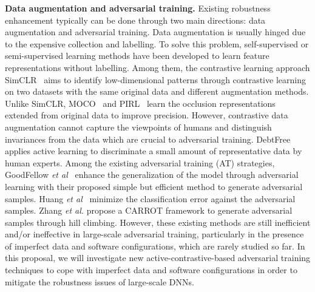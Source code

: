 {\textbf{Data augmentation and adversarial training.}}
Existing robustness enhancement typically can be done through two main directions: data augmentation and adversarial training.
Data augmentation is usually hinged due to the expensive collection and labelling. To solve this problem, self-supervised or semi-supervised learning methods have been developed to learn feature representations without labelling. 
Among them, the contrastive learning approach SimCLR~\cite{chen2020simple} aims to identify low-dimensional patterns through contrastive learning on two datasets with the same original data and different augmentation methods. 
Unlike SimCLR, MOCO~\cite{he2020momentum} and PIRL~\cite{doersch2015unsupervised} learn the occlusion representations extended from original data to improve precision. 
However, contrastive data augmentation cannot capture the viewpoints of humans and distinguish invariances from the data which are crucial to adversarial training. DebtFree~\cite{tu2022debtfree} applies active learning to discriminate a small amount of representative data by human experts. 
Among the existing adversarial training (AT) strategies, GoodFellow \textit{et al}~\cite{goodfellow2015explaining} enhance the generalization of the model through adversarial learning with their proposed simple but efficient method to generate adversarial samples. 
Huang \textit{et al}~\cite{huang2015learning} minimize the classification error against the adversarial samples. 
Zhang \textit{et al.} \cite{zhang2022robustness} propose a CARROT framework to generate adversarial samples through hill climbing. However, these existing methods are still inefficient and/or ineffective in large-scale adversarial training, particularly in the presence of imperfect data and software configurations, which are rarely studied so far. 
In this proposal, we will investigate new active-contrastive-based adversarial training techniques to cope with imperfect data and software configurations in order to mitigate the robustness issues of large-scale DNNs.

